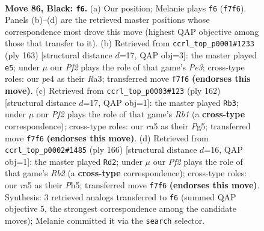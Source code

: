 \documentclass[11pt]{article}
\begin{document}
\clearpage

\begin{figure}[p]\centering
\begin{subfigure}{0.46\textwidth}\centering
\resizebox{\linewidth}{!}{%
\newchessgame
\chessboard[
  setfen={8/5pk1/4p3/R7/P3P3/5P1K/1R6/2r5 b - - 64 86},
  showmover=false,
  pgfstyle=straightmove, color=movearrow, markmove={f7-f6}
]}
\caption{}
\end{subfigure}\hfill
\begin{subfigure}{0.46\textwidth}\centering
\resizebox{\linewidth}{!}{%
\newchessgame
\chessboard[
  setfen={8/p7/3kp3/1R6/1P6/r7/3K1P2/8 b - - 1 82},
  showmover=false,
  pgfstyle=straightmove, color=movearrow, markmove={e6-e5}
]}
\caption{}
\end{subfigure}
\\[4pt]
\begin{subfigure}{0.46\textwidth}\centering
\resizebox{\linewidth}{!}{%
\newchessgame
\chessboard[
  setfen={8/r6k/6p1/6Pp/7P/5P2/6K1/1R6 w - - 77 82},
  showmover=false,
  pgfstyle=straightmove, color=movearrow, markmove={b1-b3}
]}
\caption{}
\end{subfigure}\hfill
\begin{subfigure}{0.46\textwidth}\centering
\resizebox{\linewidth}{!}{%
\newchessgame
\chessboard[
  setfen={8/r5k1/5p2/4p2P/6P1/5P1K/1R6/8 w - - 69 84},
  showmover=false,
  pgfstyle=straightmove, color=movearrow, markmove={b2-d2}
]}
\caption{}
\end{subfigure}
\caption{\textbf{Move 86, Black: \texttt{f6}.} (a) Our position; Melanie plays \texttt{f6} (\texttt{f7f6}). Panels (b)--(d) are the retrieved master positions whose correspondence most drove this move (highest QAP objective among those that transfer to it). (b) Retrieved from \texttt{ccrl\_top\_p0001\#1233} (ply 163) [structural distance $d$=17, QAP obj=3]: the master played \texttt{e5}; under $\mu$ our \emph{Pf2} plays the role of that game's \emph{Pe3}; cross-type roles: our \emph{p}e4 as their \emph{R}a3; transferred move \texttt{f7f6} \textbf{(endorses this move)}. (c) Retrieved from \texttt{ccrl\_top\_p0003\#123} (ply 162) [structural distance $d$=17, QAP obj=1]: the master played \texttt{Rb3}; under $\mu$ our \emph{Pf2} plays the role of that game's \emph{Rb1} (a \textbf{cross-type} correspondence); cross-type roles: our \emph{r}a5 as their \emph{P}g5; transferred move \texttt{f7f6} \textbf{(endorses this move)}. (d) Retrieved from \texttt{ccrl\_top\_p0002\#1485} (ply 166) [structural distance $d$=16, QAP obj=1]: the master played \texttt{Rd2}; under $\mu$ our \emph{Pf2} plays the role of that game's \emph{Rb2} (a \textbf{cross-type} correspondence); cross-type roles: our \emph{r}a5 as their \emph{P}h5; transferred move \texttt{f7f6} \textbf{(endorses this move)}. Synthesis: 3 retrieved analogs transferred to \texttt{f6} (summed QAP objective 5, the strongest correspondence among the candidate moves); Melanie committed it via the \texttt{search} selector.}
\label{fig:thought-m171}
\end{figure}
\end{document}
